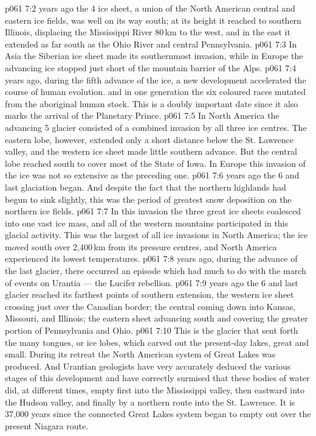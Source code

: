 \vs p061 7:2 \pc {} years ago the 4 ice sheet, a union of the North American central and eastern ice fields, was well on its way south; at its height it reached to southern Illinois, displacing the Mississippi River 80\,km to the west, and in the east it extended as far south as the Ohio River and central Pennsylvania.
\vs p061 7:3 In Asia the Siberian ice sheet made its southernmost invasion, while in Europe the advancing ice stopped just short of the mountain barrier of the Alps.
\vs p061 7:4 \pc {} years ago, during the fifth advance of the ice, a new development accelerated the course of human evolution.  and in one generation the six coloured races mutated from the aboriginal human stock. This is a doubly important date since it also marks the arrival of the Planetary Prince.
\vs p061 7:5 In North America the advancing 5 glacier consisted of a combined invasion by all three ice centres. The eastern lobe, however, extended only a short distance below the St. Lawrence valley, and the western ice sheet made little southern advance. But the central lobe reached south to cover most of the State of Iowa. In Europe this invasion of the ice was not so extensive as the preceding one.
\vs p061 7:6 \pc {} years ago the 6 and last glaciation began. And despite the fact that the northern highlands had begun to sink slightly, this was the period of greatest snow deposition on the northern ice fields.
\vs p061 7:7 In this invasion the three great ice sheets coalesced into one vast ice mass, and all of the western mountains participated in this glacial activity. This was the largest of all ice invasions in North America; the ice moved south over 2,400\,km from its pressure centres, and North America experienced its lowest temperatures.
\vs p061 7:8 \pc {} years ago, during the advance of the last glacier, there occurred an episode which had much to do with the march of events on Urantia --- the Lucifer rebellion.
\vs p061 7:9 \pc {} years ago the 6 and last glacier reached its farthest points of southern extension, the western ice sheet crossing just over the Canadian border; the central coming down into Kansas, Missouri, and Illinois; the eastern sheet advancing south and covering the greater portion of Pennsylvania and Ohio.
\vs p061 7:10 This is the glacier that sent forth the many tongues, or ice lobes, which carved out the present\hyp{}day lakes, great and small. During its retreat the North American system of Great Lakes was produced. And Urantian geologists have very accurately deduced the various stages of this development and have correctly surmised that these bodies of water did, at different times, empty first into the Mississippi valley, then eastward into the Hudson valley, and finally by a northern route into the St. Lawrence. It is 37,000 years since the connected Great Lakes system began to empty out over the present Niagara route.

